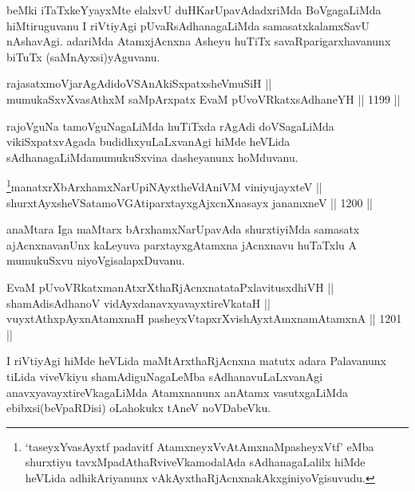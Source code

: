 \begin{artha}
beMki iTaTxkeYyayxMte elalxvU duHKarUpavAdadxriMda BoVgagaLiMda hiMtiruguvanu I riVtiyAgi pUvaRsAdhanagaLiMda samasatxkalamxSavU nAshavAgi. adariMda AtamxjAcnxna Asheyu huTiTx savaRparigarxhavanunx biTuTx (saMnAyxsi)yAguvanu.
\end{artha}


\begin{shl}
rajasatxmoVjarAgAdidoVSAnAkiSxpatxsheVmuSiH || \\
mumukaSxvXvasAthxM saMpArxpatx EvaM pUvoVRkatxsAdhaneYH \hfill || 1199 ||  
\end{shl}

\begin{artha}
rajoVguNa tamoVguNagaLiMda huTiTxda rAgAdi doVSagaLiMda vikiSxpatxvAgada budidhxyuLaLxvanAgi hiMde heVLida sAdhanagaLiMda\break mumukuSxvina dasheyanunx hoMduvanu.
\end{artha}



\begin{shl}
\footnote{`taseyxYvasAyxtf padavitf AtamxneyxVvA\s\s tAmxnaMpasheyxVtf' eMba shurxtiyu tavxMpadAthaRviveVkamodalAda sAdhanagaLalilx hiMde heVLida adhikAriyanunx vAkAyxthaRjAcnxnakAkxgi\break niyoVgisuvudu.}manatxrXbArxhamxNarUpiNAyx\s theVdAniVM viniyujayxteV || \\
shurxtAyx\s sheVSatamoVGAtiparxtayxgAjxcnXnasayx janamxneV \hfill || 1200 ||  
\end{shl}

\begin{artha}
anaMtara Iga maMtarx bArxhamxNarUpavAda shurxtiyiMda samasatx ajAcnxnavanUnx kaLeyuva parxtayxgAtamxna jAcnxnavu huTaTxlu A mumukuSxvu niyoVgisalapxDuvanu.
\end{artha}


\begin{shl}
EvaM pUvoVRkatxmanAtxrXthaRjAcnxnatataPxlavitusxdhiVH || \\
shamAdisAdhanoV vidAyxdanavxyavayxtireVkataH || \\
vuyxtAthxpAyxnAtamxnaH pasheyxVtapxrXvishAyx\s \s tAmxnamAtamxnA \hfill || 1201 || 
\end{shl} 

\begin{artha}
I riVtiyAgi hiMde heVLida maMtArxthaRjAcnxna matutx adara Palavanunx tiLida viveVkiyu shamAdiguNagaLeMba sAdhanavuLaLxvanAgi anavxyavayxtireVkagaLiMda Atamxnanunx anAtamx vasutxgaLiMda ebibxsi\break (beVpaRDisi) oLahokukx tAneV noVDabeVku.
\end{artha}

